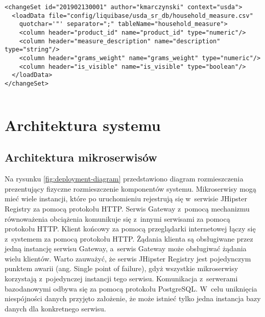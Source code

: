 \noindent\hspace{.075\textwidth}\begin{minipage}{.85\textwidth}
    \begin{verbatim}
<changeSet id="201902130001" author="kmarczynski" context="usda">
  <loadData file="config/liquibase/usda_sr_db/household_measure.csv"
    quotchar='"' separator=";" tableName="household_measure">
    <column header="product_id" name="product_id" type="numeric"/>
    <column header="measure_description" name="description" type="string"/>
    <column header="grams_weight" name="grams_weight" type="numeric"/>
    <column header="is_visible" name="is_visible" type="boolean"/>
  </loadData>
</changeSet>
    \end{verbatim}
    \begin{lstlisting}[caption={Skrpyt ładujący dane z~pliku CSV~\source{\ownwork}}, label={listing:liquibase}]
\end{lstlisting}
\end{minipage}

\section{Architektura systemu}\label{sec:system-architecture}
\subsection{Architektura mikroserwisów}\label{subsec:system-architecture:microservices}

Na rysunku \ref{fig:deployment-diagram} przedstawiono diagram rozmieszczenia prezentujący fizyczne rozmieszczenie komponentów systemu.
Mikroserwisy mogą mieć wiele instancji, które po uruchomieniu rejestrują się w~serwisie JHipster Registry za pomocą protokołu HTTP.
Serwis Gateway z~pomocą mechanizmu równoważenia obciążenia komunikuje się z~innymi serwisami za pomocą protokołu HTTP.
Klient końcowy za pomocą przeglądarki internetowej łączy się z~systemem za pomocą protokołu HTTP.
Żądania klienta są obsługiwane przez jedną instancję serwisu Gateway, a~serwis Gateway może obsługiwać żądania wielu klientów.
Warto zauważyć, że serwis JHipster Registry jest pojedynczym punktem awarii (ang. Single point of failure), gdyż wszystkie mikroserwisy korzystają z~pojedynczej instancji tego serwisu.
Komunikacja z~serwerami bazodanowymi odbywa się za pomocą protokołu PostgreSQL.
W~celu uniknięcia niespójności danych przyjęto założenie, że może istnieć tylko jedna instancja bazy danych dla konkretnego serwisu.


